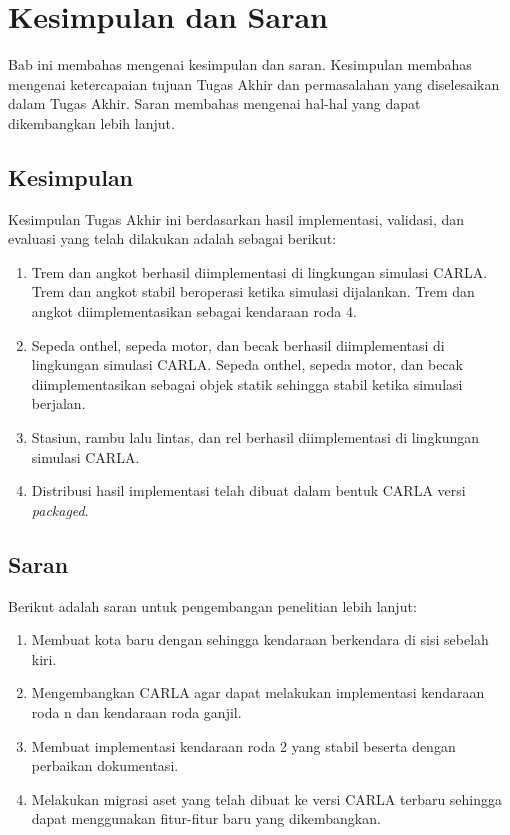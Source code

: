 \chapter{Kesimpulan dan Saran}

Bab ini membahas mengenai kesimpulan dan saran. Kesimpulan membahas mengenai
ketercapaian tujuan Tugas Akhir dan permasalahan yang diselesaikan dalam Tugas
Akhir. Saran membahas mengenai hal-hal yang dapat dikembangkan lebih lanjut.

\section{Kesimpulan}

Kesimpulan Tugas Akhir ini berdasarkan hasil implementasi, validasi, dan
evaluasi yang telah dilakukan adalah sebagai berikut:

\begin{enumerate}
	\item Trem dan angkot berhasil diimplementasi di lingkungan simulasi CARLA.
	Trem dan angkot stabil beroperasi ketika simulasi dijalankan. Trem dan
	angkot diimplementasikan sebagai kendaraan roda 4.

	\item Sepeda onthel, sepeda motor, dan becak berhasil diimplementasi di
	lingkungan simulasi CARLA. Sepeda onthel, sepeda motor, dan becak diimplementasikan
	sebagai objek statik sehingga stabil ketika simulasi berjalan.

	\item Stasiun, rambu lalu lintas, dan rel berhasil diimplementasi di
	lingkungan simulasi CARLA.

	\item Distribusi hasil implementasi telah dibuat dalam bentuk CARLA versi
	\textit{packaged}.

\end{enumerate}

\section{Saran}

Berikut adalah saran untuk pengembangan penelitian lebih lanjut:

\begin{enumerate}
	\item Membuat kota baru dengan sehingga kendaraan berkendara di sisi sebelah
	kiri.
	\item Mengembangkan CARLA agar dapat melakukan implementasi kendaraan roda
	n dan kendaraan roda ganjil.
	\item Membuat implementasi kendaraan roda 2 yang stabil beserta dengan
	perbaikan dokumentasi.
	\item Melakukan migrasi aset yang telah dibuat ke versi CARLA terbaru
	sehingga dapat menggunakan fitur-fitur baru yang dikembangkan.
\end{enumerate}
